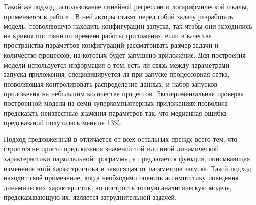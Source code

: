 		Такой же подход, использование линейной регрессии и логарифмической шкалы, применяется в работе \cite{focused_regression}. В ней авторы ставят перед собой задачу разработать модель, позволяющую находить конфигурации запуска, так чтобы они находились на кривой постоянного времени работы приложения, если в качестве пространства параметров конфигураций рассматривать размер задачи и количество процессов, на которых будет запущено приложение. Для построения модели используется информация о том, есть ли связь между параметрами запуска приложения, специфицируется ли при запуске процессорная сетка, позволяющая контролировать распределение данных, и набор запусков приложения на небольшим количестве процессов. Экспериментальная проверка построенной модели на семи суперкомпьютерных приложениях позволила предсказать неизвестные значения параметров так, что медианная ошибка предсказаний получилась меньше 13\%.

		Подход предложенный в \cite{analytic_func} отличается от всех остальных прежде всего тем, что строится не просто предсказания значений той или иной динамической характеристики параллельной программы, а предлагается функция, описывающая изменение этой характеристики и зависящая от параметров запуска. Такой подход находит своё применение, когда необходимо оценить ассимптотику поведения динамических характеристик, но построить точную аналитическую модель, предсказывающую их, является затруднительной задачей.
			
